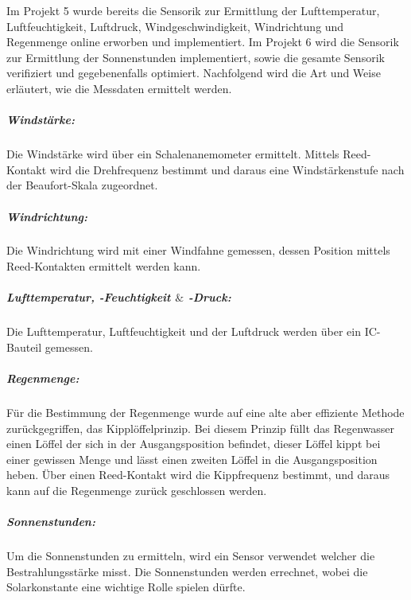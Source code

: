 
Im Projekt 5 wurde bereits die Sensorik zur Ermittlung der Lufttemperatur, Luftfeuchtigkeit, Luftdruck, Windgeschwindigkeit, Windrichtung und Regenmenge online erworben und implementiert. Im Projekt 6 wird die Sensorik zur Ermittlung der Sonnenstunden implementiert, sowie die gesamte Sensorik verifiziert und gegebenenfalls optimiert. Nachfolgend wird die Art und Weise erläutert, wie die Messdaten ermittelt werden.\\
\subparagraph{Windstärke:}
Die Windstärke wird über ein Schalenanemometer ermittelt. Mittels Reed-Kontakt wird die Drehfrequenz bestimmt und daraus eine Windstärkenstufe nach der Beaufort-Skala zugeordnet.\\
\subparagraph{Windrichtung:}
Die Windrichtung wird mit einer Windfahne gemessen, dessen Position mittels Reed-Kontakten ermittelt werden kann.\\
\subparagraph{Lufttemperatur, -Feuchtigkeit $\&$ -Druck:}
Die Lufttemperatur, Luftfeuchtigkeit und der Luftdruck werden über ein IC-Bauteil gemessen.\\
\subparagraph{Regenmenge:}
Für die Bestimmung der Regenmenge wurde auf eine alte aber effiziente Methode zurückgegriffen, das Kipplöffelprinzip. Bei diesem Prinzip füllt das Regenwasser einen Löffel der sich in der Ausgangsposition befindet, dieser Löffel kippt bei einer gewissen Menge und lässt einen zweiten Löffel in die Ausgangsposition heben. Über einen Reed-Kontakt wird die Kippfrequenz bestimmt, und daraus kann auf die Regenmenge zurück geschlossen werden.\\
\subparagraph{Sonnenstunden:}
Um die Sonnenstunden zu ermitteln, wird ein Sensor verwendet welcher die Bestrahlungsstärke misst. Die Sonnenstunden werden errechnet, wobei die Solarkonstante eine wichtige Rolle spielen dürfte.\\
\newpage

